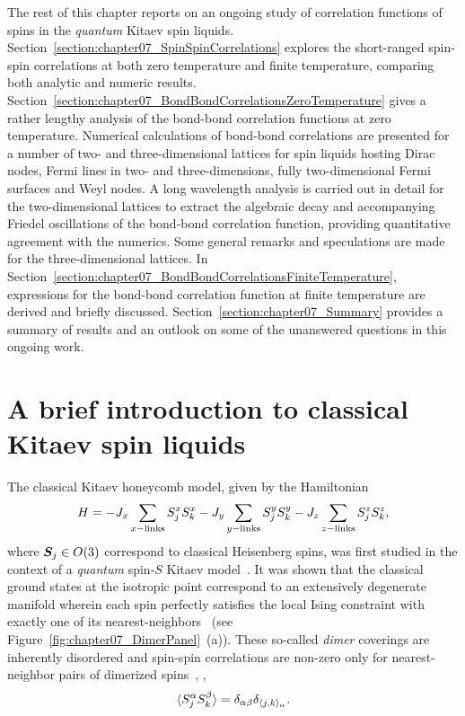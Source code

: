 The rest of this chapter reports on an ongoing study of correlation functions of spins in the \textit{quantum} Kitaev spin liquids.
Section~\ref{section:chapter07_SpinSpinCorrelations} explores the short-ranged spin-spin correlations at both zero temperature and finite temperature, comparing both analytic and numeric results.
Section~\ref{section:chapter07_BondBondCorrelationsZeroTemperature} gives a rather lengthy analysis of the bond-bond correlation functions at zero temperature.
Numerical calculations of bond-bond correlations are presented for a number of two- and three-dimensional lattices for spin liquids hosting Dirac nodes, Fermi lines in two- and three-dimensions, fully two-dimensional Fermi surfaces and Weyl nodes.
A long wavelength analysis is carried out in detail for the two-dimensional lattices to extract the algebraic decay and accompanying Friedel oscillations of the bond-bond correlation function, providing quantitative agreement with the numerics.
Some general remarks and speculations are made for the three-dimensional lattices.
In Section~\ref{section:chapter07_BondBondCorrelationsFiniteTemperature}, expressions for the bond-bond correlation function at finite temperature are derived and briefly discussed.
Section~\ref{section:chapter07_Summary} provides a summary of results and an outlook on some of the unanswered questions in this ongoing work.


%
%
\section{A brief introduction to classical Kitaev spin liquids}
\label{section:chapter07_ClassicalCorrelations}
%
%
The classical Kitaev honeycomb model, given by the Hamiltonian
%
\begin{equation}
	H = -J_x \sum_{x {\rm -links}} S_j^x S_k^x - J_y \sum_{y {\rm -links}} S_j^y S_k^y - J_z \sum_{z {\rm -links}} S_j^z S_k^z,
\end{equation}
%
where $\bm{S}_j \in O(3)$ correspond to classical Heisenberg spins, was first studied in the context of a \textit{quantum} spin-$S$ Kitaev model~\cite{BaskaranPRB2008}.
It was shown that the classical ground states at the isotropic point correspond to an extensively degenerate manifold wherein each spin perfectly satisfies the local Ising constraint with exactly one of its nearest-neighbors~\cite{BaskaranPRB2008,ChandraPRE2010} (see Figure~\ref{fig:chapter07_DimerPanel}~(a)).
These so-called \textit{dimer} coverings are inherently disordered and spin-spin correlations are non-zero only for nearest-neighbor pairs of dimerized spins~\cite{Ghannad2019}, \ie,
%
\begin{equation}
	\langle S_j^{\alpha} S_k^{\beta} \rangle = \delta_{\alpha\beta} \delta_{\langle j,k \rangle_\alpha}.
\end{equation}
%

